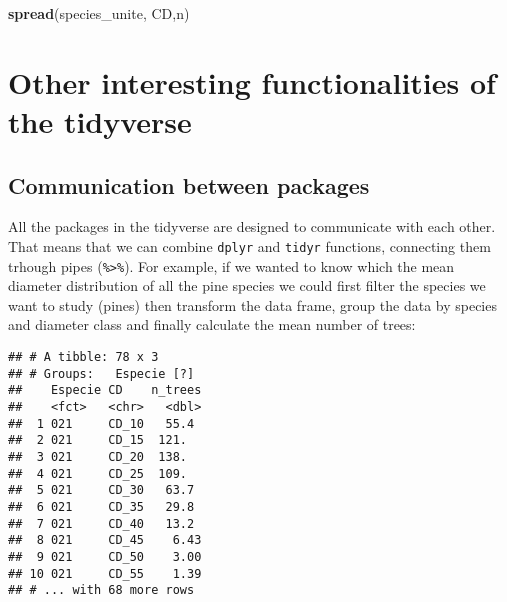\documentclass[]{article}
\newenvironment{Shaded}{\begin{snugshade}}{\end{snugshade}}
\newcommand{\KeywordTok}[1]{\textcolor[rgb]{0.13,0.29,0.53}{\textbf{#1}}}
\newcommand{\DataTypeTok}[1]{\textcolor[rgb]{0.13,0.29,0.53}{#1}}
\newcommand{\DecValTok}[1]{\textcolor[rgb]{0.00,0.00,0.81}{#1}}
\newcommand{\StringTok}[1]{\textcolor[rgb]{0.31,0.60,0.02}{#1}}
\newcommand{\OperatorTok}[1]{\textcolor[rgb]{0.81,0.36,0.00}{\textbf{#1}}}
\newcommand{\NormalTok}[1]{#1}
\begin{document}
\begin{Shaded}
\begin{Highlighting}[]
\KeywordTok{spread}\NormalTok{(species_unite, CD,n)}
\end{Highlighting}
\end{Shaded}

\section{Other interesting functionalities of the
tidyverse}\label{other-interesting-functionalities-of-the-tidyverse}

\subsection{Communication between
packages}\label{communication-between-packages}

All the packages in the tidyverse are designed to communicate with each
other. That means that we can combine \texttt{dplyr} and \texttt{tidyr}
functions, connecting them trhough pipes (\texttt{\%\textgreater{}\%}).
For example, if we wanted to know which the mean diameter distribution
of all the pine species we could first filter the species we want to
study (pines) then transform the data frame, group the data by species
and diameter class and finally calculate the mean number of trees:

\begin{Shaded}
\end{Shaded}

\begin{verbatim}
## # A tibble: 78 x 3
## # Groups:   Especie [?]
##    Especie CD    n_trees
##    <fct>   <chr>   <dbl>
##  1 021     CD_10   55.4 
##  2 021     CD_15  121.  
##  3 021     CD_20  138.  
##  4 021     CD_25  109.  
##  5 021     CD_30   63.7 
##  6 021     CD_35   29.8 
##  7 021     CD_40   13.2 
##  8 021     CD_45    6.43
##  9 021     CD_50    3.00
## 10 021     CD_55    1.39
## # ... with 68 more rows
\end{verbatim}
\end{document}

